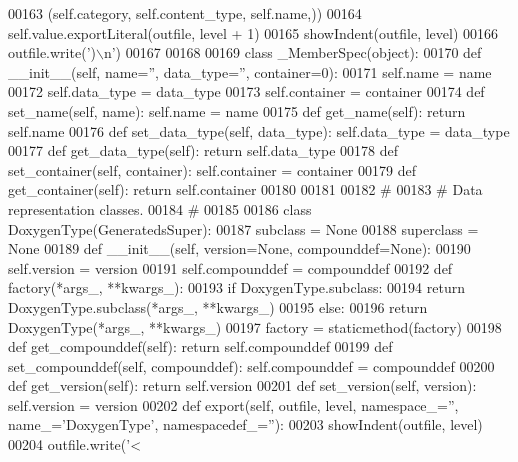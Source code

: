 \begin{DoxyCode}
{{{{{{{{{{{{{{{{{{{{00163                 (self.category, self.content_type, self.name,))
00164             self.value.exportLiteral(outfile, level + 1)
00165             showIndent(outfile, level)
00166             outfile.write(\textcolor{stringliteral}{')\(\backslash\)n'})
00167 
00168 
00169 \textcolor{keyword}{class }_MemberSpec(object):
00170     \textcolor{keyword}{def }__init__(self, name='', data\_type='', container=0):
00171         self.name = name
00172         self.data_type = data\_type
00173         self.container = container
00174     \textcolor{keyword}{def }set_name(self, name): self.name = name
00175     \textcolor{keyword}{def }get_name(self): \textcolor{keywordflow}{return} self.name
00176     \textcolor{keyword}{def }set_data_type(self, data\_type): self.data\_type = data\_type
00177     \textcolor{keyword}{def }get_data_type(self): \textcolor{keywordflow}{return} self.data\_type
00178     \textcolor{keyword}{def }set_container(self, container): self.container = container
00179     \textcolor{keyword}{def }get_container(self): \textcolor{keywordflow}{return} self.container
00180 
00181 
00182 \textcolor{comment}{#}
00183 \textcolor{comment}{# Data representation classes.}
00184 \textcolor{comment}{#}
00185 
00186 \textcolor{keyword}{class }DoxygenType(GeneratedsSuper):
00187     subclass = \textcolor{keywordtype}{None}
00188     superclass = \textcolor{keywordtype}{None}
00189     \textcolor{keyword}{def }__init__(self, version=None, compounddef=None):
00190         self.version = version
00191         self.compounddef = compounddef
00192     \textcolor{keyword}{def }factory(*args\_, **kwargs\_):
00193         \textcolor{keywordflow}{if} DoxygenType.subclass:
00194             \textcolor{keywordflow}{return} DoxygenType.subclass(*args\_, **kwargs\_)
00195         \textcolor{keywordflow}{else}:
00196             \textcolor{keywordflow}{return} DoxygenType(*args\_, **kwargs\_)
00197     factory = staticmethod(factory)
00198     \textcolor{keyword}{def }get_compounddef(self): \textcolor{keywordflow}{return} self.compounddef
00199     \textcolor{keyword}{def }set_compounddef(self, compounddef): self.compounddef = compounddef
00200     \textcolor{keyword}{def }get_version(self): \textcolor{keywordflow}{return} self.version
00201     \textcolor{keyword}{def }set_version(self, version): self.version = version
00202     \textcolor{keyword}{def }export(self, outfile, level, namespace\_='', name\_='DoxygenType', namespacedef\_=''):
00203         showIndent(outfile, level)
00204         outfile.write(\textcolor{stringliteral}{'<%
}}}}}}}}}}}}}}}}}}}}}
\end{DoxyCode}
